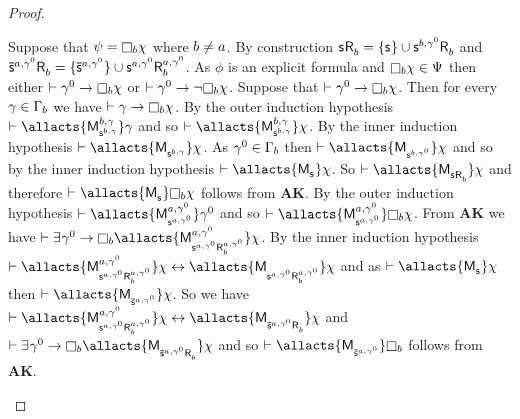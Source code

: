 \begin{proof}
\begin{enumerate}
            Suppose that $\psi = \necessary[\agentB] \chi$ where $b \neq a$. 
            By construction $\aStateS \aAccessibility{\agentB} = \{\aStateS\} \cup \aStateS[\agentB,\gamma^0] \aAccessibility{\agentB}$ and $\aPStateS[\agentA,\gamma^0] \aAccessibility{\agentB} = \{\aPStateS[\agentA,\gamma^0]\} \cup \aStateS[\agentA,\gamma^0] \aAccessibility[\agentA,\gamma^0]{\agentB}$.
            As $\phi$ is an explicit formula and $\necessary[\agentB] \chi \in \Psi$ then either $\proves \gamma^0 \implies \necessary[\agentB] \chi$ or $\proves \gamma^0 \implies \neg \necessary[\agentB] \chi$.
            Suppose that $\proves \gamma^0 \implies \necessary[\agentB] \chi$.
            Then for every $\gamma \in \Gamma_b$ we have $\proves \gamma \implies \necessary[\agentB] \chi$.
            By the outer induction hypothesis $\proves \allacts{\aPModel[\agentB,\gamma]{\aStateS[\agentB,\gamma]}} \gamma$ and so $\proves \allacts{\aPModel[\agentB,\gamma]{\aStateS[\agentB,\gamma]}} \chi$.
            By the inner induction hypothesis $\proves \allacts{\aPModel{\aStateS[\agentB,\gamma]}} \chi$.
            As $\gamma^0 \in \Gamma_b$ then $\proves \allacts{\aPModel{\aStateS[\agentB,\gamma^0]}} \chi$ and so by the inner induction hypothesis $\proves \allacts{\aPModel{\aStateS}} \chi$.
            So $\proves \allacts{\aPModel{\aStateS \aAccessibility{\agentB}}} \chi$ and therefore $\proves \allacts{\aPModel{\aStateS}} \necessary[\agentB] \chi$ follows from {\bf AK}.
            By the outer induction hypothesis $\proves \allacts{\aPModel[\agentA,\gamma^0]{\aStateS[\agentA,\gamma^0]}} \gamma^0$ and so $\proves \allacts{\aPModel[\agentA,\gamma^0]{\aStateS[\agentA,\gamma^0]}} \necessary[\agentB] \chi$.
            From {\bf AK} we have $\proves \somerefs{\gamma^0} \implies \necessary[\agentB] \allacts{\aPModel[\agentA,\gamma^0]{\aStateS[\agentA,\gamma^0] \aAccessibility[\agentA,\gamma^0]{\agentB}}} \chi$.
            By the inner induction hypothesis $\proves \allacts{\aPModel[\agentA,\gamma^0]{\aStateS[\agentA,\gamma^0] \aAccessibility[\agentA,\gamma^0]{\agentB}}} \chi \iff \allacts{\aPModel{\aStateS[\agentA,\gamma^0] \aAccessibility[\agentA,\gamma^0]{\agentB}}} \chi$ and as $\proves \allacts{\aPModel{\aStateS}} \chi$ then $\proves \allacts{\aPModel{\aPStateS[\agentA,\gamma^0]}} \chi$.
            So we have $\proves \allacts{\aPModel[\agentA,\gamma^0]{\aStateS[\agentA,\gamma^0] \aAccessibility[\agentA,\gamma^0]{\agentB}}} \chi \iff \allacts{\aPModel{\aPStateS[\agentA,\gamma^0] \aAccessibility{\agentB}}} \chi$ and $\proves \somerefs{\gamma^0} \implies \necessary[\agentB] \allacts{\aPModel{\aPStateS[\agentA,\gamma^0] \aAccessibility{\agentB}}} \chi$ and so $\proves \allacts{\aPModel{\aPStateS[\agentA,\gamma^0]}} \necessary[\agentB]$ follows from {\bf AK}.

\end{enumerate}
\end{proof}
